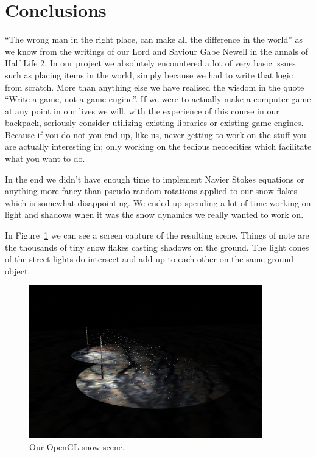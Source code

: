 \documentclass[a4paper,12pt]{article}
\begin{document}
\section{Conclusions}

``The wrong man in the right place, can make all the difference in the world'' as we know from the writings of our Lord and Saviour Gabe Newell in the annals of Half Life 2. In our project we absolutely encountered a lot of very basic issues such as placing items in the world, simply because we had to write that logic from scratch. More than anything else we have realised the wisdom in the quote ``Write a game, not a game engine''. If we were to actually make a computer game at any point in our lives we will, with the experience of this course in our backpack, seriously consider utilizing existing libraries or existing game engines. Because if you do not you end up, like us, never getting to work on the stuff you are actually interesting in; only working on the tedious neccecities which facilitate what you want to do.

In the end we didn't have enough time to implement Navier Stokes equations or anything more fancy than pseudo random rotations applied to our snow flakes which is somewhat disappointing. We ended up spending a lot of time working on light and shadows when it was the snow dynamics we really wanted to work on.

In Figure~\ref{fig:result} we can see a screen capture of the resulting scene. Things of note are the thousands of tiny snow flakes casting shadows on the ground. The light cones of the street lights do intersect and add up to each other on the same ground object.

\begin{figure}[ht]
  \centering
  \includegraphics[width=0.9\textwidth]{result}
  \caption{\label{fig:result} Our OpenGL snow scene.}
\end{figure}
\end{document}
